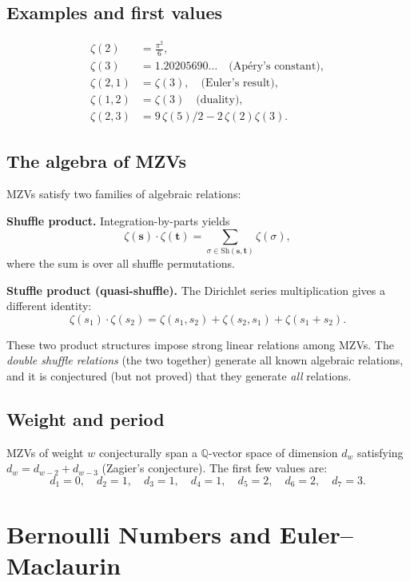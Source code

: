 \documentclass[12pt,a4paper]{amsart}
\theoremstyle{definition}
\theoremstyle{remark}
\begin{document}
\subsection{Examples and first values}

\begin{align*}
  \zeta(2) &= \frac{\pi^2}{6}, \\
  \zeta(3) &= 1.20205690\ldots \quad \text{(Apéry's constant)}, \\
  \zeta(2, 1) &= \zeta(3), \quad \text{(Euler's result)}, \\
  \zeta(1, 2) &= \zeta(3) \quad \text{(duality)}, \\
  \zeta(2, 3) &= 9\,\zeta(5)/2 - 2\,\zeta(2)\zeta(3).
\end{align*}

\subsection{The algebra of MZVs}

MZVs satisfy two families of algebraic relations:

\textbf{Shuffle product.} Integration-by-parts yields
\[
  \zeta(\mathbf{s}) \cdot \zeta(\mathbf{t}) = \sum_{\sigma \in \mathrm{Sh}(\mathbf{s}, \mathbf{t})}
  \zeta(\sigma),
\]
where the sum is over all shuffle permutations.

\textbf{Stuffle product (quasi-shuffle).} The Dirichlet series multiplication gives
a different identity:
\[
  \zeta(s_1) \cdot \zeta(s_2) = \zeta(s_1, s_2) + \zeta(s_2, s_1) + \zeta(s_1 + s_2).
\]

These two product structures impose strong linear relations among MZVs. The
\emph{double shuffle relations} (the two together) generate all known algebraic
relations, and it is conjectured (but not proved) that they generate \emph{all}
relations.

\subsection{Weight and period}

MZVs of weight $w$ conjecturally span a $\mathbb{Q}$-vector space of dimension
$d_w$ satisfying $d_w = d_{w-2} + d_{w-3}$ (Zagier's conjecture). The first
few values are:
\[
  d_1 = 0,\quad d_2 = 1,\quad d_3 = 1,\quad d_4 = 1,\quad d_5 = 2,
  \quad d_6 = 2, \quad d_7 = 3.
\]

\section{Bernoulli Numbers and Euler--Maclaurin}
\end{document}
